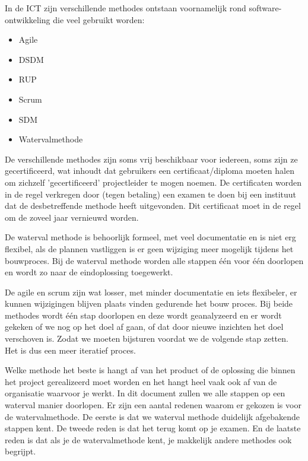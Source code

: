 In de ICT zijn verschillende methodes ontstaan voornamelijk rond software-ontwikkeling die veel gebruikt worden:
\begin{itemize}
\item Agile
\item DSDM
\item RUP
\item Scrum
\item SDM
\item Watervalmethode
\end{itemize}

De verschillende methodes zijn soms vrij beschikbaar voor iedereen, soms zijn ze gecertificeerd, wat inhoudt dat gebruikers een certificaat/diploma moeten halen om zichzelf 'gecertificeerd' projectleider te mogen noemen. De certificaten worden in de regel verkregen door (tegen betaling) een examen te doen bij een instituut dat de desbetreffende methode heeft uitgevonden. Dit certificaat moet in de regel om de zoveel jaar vernieuwd worden.

De waterval methode is behoorlijk formeel, met veel documentatie en is niet erg flexibel, als de plannen vastliggen is er geen wijziging meer mogelijk tijdens het bouwproces. Bij de waterval methode worden alle stappen \'e\'en voor \'e\'en doorlopen en wordt zo naar de eindoplossing toegewerkt.

De agile en scrum zijn wat losser, met minder documentatie en iets flexibeler, er kunnen wijzigingen blijven plaats vinden gedurende het bouw proces. Bij beide methodes wordt \'e\'en stap doorlopen en deze wordt geanalyzeerd en er wordt gekeken of we nog op het doel af gaan, of dat door nieuwe inzichten het doel verschoven is. Zodat we moeten bijsturen voordat we de volgende stap zetten. Het is dus een meer iteratief proces.

Welke methode het beste is hangt af van het product of de oplossing die binnen het project gerealizeerd moet worden en het hangt heel vaak ook af van de organisatie waarvoor je werkt. In dit document zullen we alle stappen op een waterval manier doorlopen. Er zijn een aantal redenen waarom er gekozen is voor de watervalmethode. De eerste is dat we waterval methode duidelijk afgebakende stappen kent. De tweede reden is dat het terug komt op je examen. En de laatste reden is dat als je de watervalmethode kent, je makkelijk andere methodes ook begrijpt.
